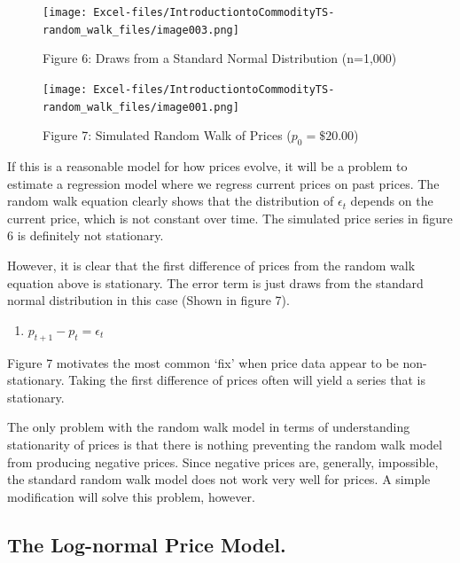 \documentclass[
  letterpaper,
  DIV=11,
  numbers=noendperiod]{scrreprt}
\providecommand{\tightlist}{%
  \setlength{\itemsep}{0pt}\setlength{\parskip}{0pt}}\usepackage{longtable,booktabs,array}
\begin{document}
\begin{figure}[H]

{\centering \texttt{[image: Excel-files/IntroductiontoCommodityTS-random\_walk\_files/image003.png]}

}

\caption{Figure 6: Draws from a Standard Normal Distribution (n=1,000)}

\end{figure}%
\begin{figure}[H]

{\centering \texttt{[image: Excel-files/IntroductiontoCommodityTS-random\_walk\_files/image001.png]}

}

\caption{Figure 7: Simulated Random Walk of Prices (\(p_0 = \$20.00\))}

\end{figure}%

If this is a reasonable model for how prices evolve, it will be a
problem to estimate a regression model where we regress current prices
on past prices. The random walk equation clearly shows that the
distribution of \(\epsilon_t\) depends on the current price, which is
not constant over time. The simulated price series in figure 6 is
definitely not stationary.

However, it is clear that the first difference of prices from the random
walk equation above is stationary. The error term is just draws from the
standard normal distribution in this case (Shown in figure 7).

\begin{enumerate}
\def\labelenumi{(\arabic{enumi})}
\setcounter{enumi}{3}
\tightlist
\item
  \(p_{t+1} - p_{t} = \epsilon_t\)
\end{enumerate}

Figure 7 motivates the most common `fix' when price data appear to be
non-stationary. Taking the first difference of prices often will yield a
series that is stationary.

The only problem with the random walk model in terms of understanding
stationarity of prices is that there is nothing preventing the random
walk model from producing negative prices. Since negative prices are,
generally, impossible, the standard random walk model does not work very
well for prices. A simple modification will solve this problem, however.

\subsection{The Log-normal Price
Model.}\label{the-log-normal-price-model.}
\end{document}
